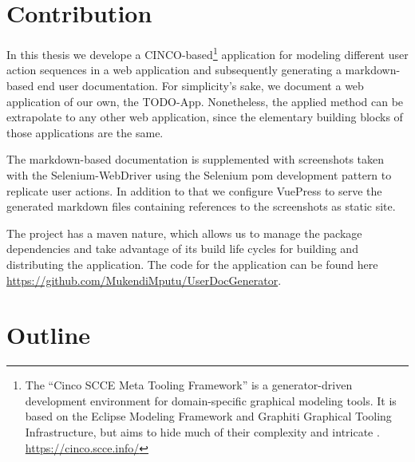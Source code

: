 \section{Contribution}
In this thesis we develope a CINCO-based\footnote{The “Cinco SCCE Meta Tooling Framework” is a generator-driven development environment for domain-specific graphical modeling tools. It is based on the Eclipse Modeling Framework and Graphiti Graphical Tooling Infrastructure, but aims to hide much of their complexity and intricate . \url{https://cinco.scce.info/}} application for modeling different user action sequences in a web application and subsequently generating a markdown-based end user documentation. For simplicity's sake, we document a web application of our own, the TODO-App. Nonetheless, the applied method can be extrapolate to any other web application, since the elementary building blocks of those applications are the same.

The markdown-based documentation is supplemented with screenshots taken with the Selenium-WebDriver using the \gls{Selenium} \acrfull{pom} development pattern to replicate user actions. In addition to that we configure \gls{VuePress} to serve the generated markdown files containing references to the screenshots as static site.

The project has a maven nature, which allows us to manage the package dependencies and take advantage of its build life cycles for building and distributing the application. The code for the application can be found here \url{https://github.com/MukendiMputu/UserDocGenerator}.
\section{Outline}
